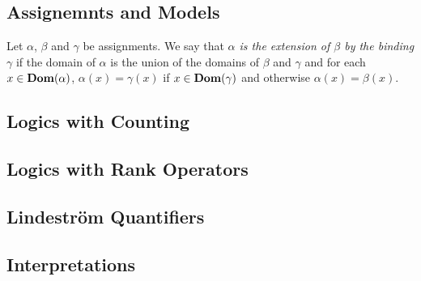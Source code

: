 \documentclass[../main/thesis.tex]{subfiles}
\begin{document}
\subsection{Assignemnts and Models}

Let $\alpha$, $\beta$ and $\gamma$ be assignments. We say that \emph{$\alpha$ is
  the extension of $\beta$ by the binding $\gamma$} if the domain of $\alpha$ is
the union of the domains of $\beta$ and $\gamma$ and for each $x \in
\text{\textbf{Dom}}(\alpha)$, $\alpha (x) = \gamma(x)$ if $x \in \text{\textbf{Dom}}(\gamma)$ and otherwise
$\alpha (x) = \beta(x)$.

\subsection{Logics with Counting}
\subsection{Logics with Rank Operators}
\subsection{Lindestr\"{o}m Quantifiers}
\subsection{Interpretations}
\end{document}
